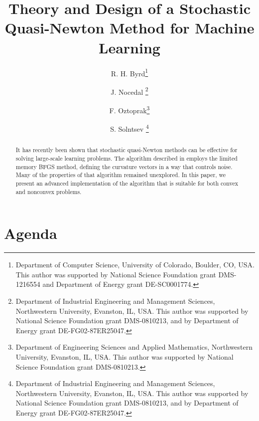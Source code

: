 \documentclass[12pt]{article}
\begin{document}
\title{ Theory and Design of a Stochastic Quasi-Newton Method for Machine Learning}
\author{R. H. Byrd\thanks{Department of Computer Science, University of Colorado,
        Boulder, CO, USA.  This author was supported by National Science Foundation
        grant DMS-1216554 and Department of Energy grant DE-SC0001774.}
        \and 
       J. Nocedal \thanks{Department of Industrial Engineering and Management Sciences, Northwestern University, 
       Evanston, IL, USA.  This author was supported by National Science Foundation grant DMS-0810213, and by Department 
       of Energy grant DE-FG02-87ER25047.} 
       \and
       F. Oztoprak\thanks{Department of Engineering Sciences and Applied Mathematics, Northwestern University, 
       Evanston, IL, USA.  This author was supported by National Science Foundation grant DMS-0810213.} 
        \and   
        S. Solntsev \thanks{Department of Industrial Engineering and Management Sciences, Northwestern University, 
       Evanston, IL, USA.  This author was supported by National Science Foundation grant DMS-0810213, and by Department 
       of Energy grant DE-FG02-87ER25047.}
      }

\maketitle
\begin{abstract}{ It has recently been shown that stochastic quasi-Newton methods can be effective for solving large-scale
learning problems. The algorithm described in \cite{sammy} employs the limited memory BFGS method, defining the curvature vectors in a way that controls noise. Many of the properties of that algorithm remained unexplored. In this paper, we present an advanced implementation of the algorithm that is suitable for both convex and nonconvex problems.
}
\end{abstract}
\newpage


\section{Agenda}
\label{agenda}
\end{document}
